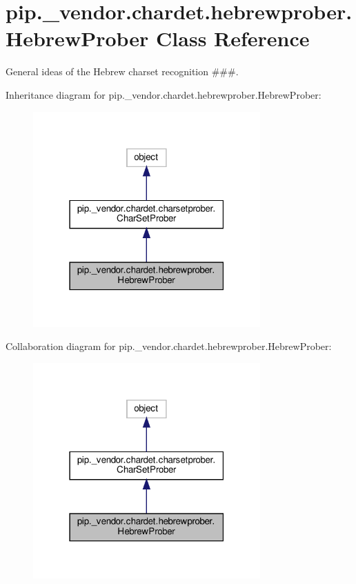 \hypertarget{classpip_1_1__vendor_1_1chardet_1_1hebrewprober_1_1HebrewProber}{}\section{pip.\+\_\+vendor.\+chardet.\+hebrewprober.\+Hebrew\+Prober Class Reference}
\label{classpip_1_1__vendor_1_1chardet_1_1hebrewprober_1_1HebrewProber}


General ideas of the Hebrew charset recognition \#\#\#.  




Inheritance diagram for pip.\+\_\+vendor.\+chardet.\+hebrewprober.\+Hebrew\+Prober\+:
\nopagebreak
\begin{figure}[H]
\begin{center}
\leavevmode
\includegraphics[width=247pt]{classpip_1_1__vendor_1_1chardet_1_1hebrewprober_1_1HebrewProber__inherit__graph}
\end{center}
\end{figure}


Collaboration diagram for pip.\+\_\+vendor.\+chardet.\+hebrewprober.\+Hebrew\+Prober\+:
\nopagebreak
\begin{figure}[H]
\begin{center}
\leavevmode
\includegraphics[width=247pt]{classpip_1_1__vendor_1_1chardet_1_1hebrewprober_1_1HebrewProber__coll__graph}
\end{center}
\end{figure}

